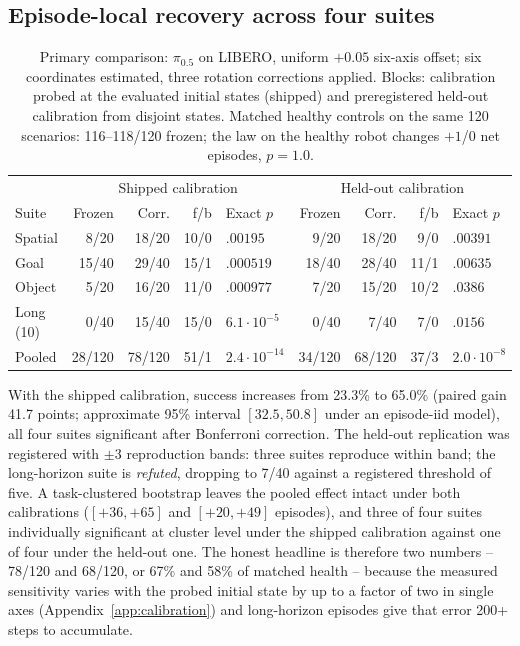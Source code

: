 \subsection{Episode-local recovery across four suites}
\begin{table}[H]
\centering\small
\caption{Primary comparison: $\pi_{0.5}$ on LIBERO, uniform $+0.05$ six-axis
offset; six coordinates estimated, three rotation corrections applied.
Blocks: calibration probed at the evaluated initial states (shipped) and
preregistered held-out calibration from disjoint states. Matched healthy
controls on the same 120 scenarios: 116--118/120 frozen; the law on the
healthy robot changes $+1$/$0$ net episodes, $p=1.0$.}
\label{tab:headline}
\setlength{\tabcolsep}{4pt}
\begin{tabular}{lrrrl|rrrl}
\toprule
 & \multicolumn{4}{c|}{Shipped calibration} & \multicolumn{4}{c}{Held-out calibration}\\
Suite & Frozen & Corr. & f/b & Exact $p$ & Frozen & Corr. & f/b & Exact $p$\\
\midrule
Spatial & 8/20 & 18/20 & 10/0 & $.00195$ & 9/20 & 18/20 & 9/0 & $.00391$\\
Goal & 15/40 & 29/40 & 15/1 & $.000519$ & 18/40 & 28/40 & 11/1 & $.00635$\\
Object & 5/20 & 16/20 & 11/0 & $.000977$ & 7/20 & 15/20 & 10/2 & $.0386$\\
Long (10) & 0/40 & 15/40 & 15/0 & $6.1\cdot10^{-5}$ & 0/40 & 7/40 & 7/0 & $.0156$\\
\midrule
Pooled & 28/120 & 78/120 & 51/1 & $2.4\cdot10^{-14}$ & 34/120 & 68/120 & 37/3 & $2.0\cdot10^{-8}$\\
\bottomrule
\end{tabular}
\end{table}
With the shipped calibration, success increases from 23.3\% to 65.0\%
(paired gain 41.7 points; approximate 95\% interval $[32.5,50.8]$ under an
episode-iid model), all four suites significant after Bonferroni correction.
The held-out replication was registered with $\pm3$ reproduction bands:
three suites reproduce within band; the long-horizon suite is
\emph{refuted}, dropping to 7/40 against a registered threshold of five. A task-clustered bootstrap leaves the pooled effect intact under both
calibrations ($[+36,+65]$ and $[+20,+49]$ episodes), and three of four suites
individually significant at cluster level under the shipped calibration
against one of four under the held-out one.
The honest headline is therefore two numbers -- 78/120 and 68/120, or 67\%
and 58\% of matched health -- because the measured sensitivity varies with
the probed initial state by up to a factor of two in single axes
(Appendix~\ref{app:calibration}) and long-horizon episodes give that error
200+ steps to accumulate.

